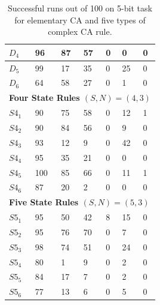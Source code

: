 \documentclass{elsarticle}
\begin{document}
\begin{multicols}{2}
\begin{table}[!htbp]
\begin{tabular}{|l|l|l|l|l|l|l|}
$D_{4}$ & 96 & 87 & 57 & 0 & 0 & 0 \\ \hline
$D_{5}$ & 99 & 17 & 35 & 0 & 25 & 0 \\ \hline
$D_{6}$ & 64 & 58 & 27 & 0 & 1 & 0 \\ \hline
\multicolumn{7}{|l|}{\textbf{Four State Rules \boldmath$(S,N) = (4,3)$}} \\ 
\hline
$S4_{1}$ & 90 & 75 & 58 & 0 & 12  & 1 \\ \hline
$S4_{2}$ & 90 & 84 & 56 & 0 & 9 & 0  \\ \hline
$S4_{3}$ & 93 & 12 & 9 & 0 & 42 & 0 \\ \hline
$S4_{4}$ & 95 & 35 & 21 & 0 & 0 & 0 \\ \hline
$S4_{5}$ & 100 & 85 & 66 & 0 & 11 & 1 \\ \hline
$S4_{6}$ & 87 & 20 & 2 & 0 & 0 & 0 \\ \hline
\multicolumn{7}{|l|}{\textbf{Five State Rules \boldmath$(S,N) = (5,3)$}} \\ 
\hline
$S5_{1}$ & 95 & 50 & 42 & 8 & 15 & 0 \\ \hline
$S5_{2}$ & 95 & 76 & 70 & 0 & 7 & 0 \\ \hline
$S5_{3}$ & 98 & 74 & 51 & 0 & 24 & 0 \\ \hline
$S5_{4}$ & 80 & 1 & 9 & 0 & 2 & 0 \\ \hline
$S5_{5}$ & 84 & 17 & 7 & 0 & 2 & 0 \\ \hline
$S5_{6}$ & 77 & 13 & 6 & 0 & 5 & 0 \\ \hline
\end{tabular}
\caption{Successful runs out of 100 on 5-bit task for elementary CA and five 
    types of complex CA rule.}
\label{table:results}
\end{table}




\end{multicols}
\end{document}
